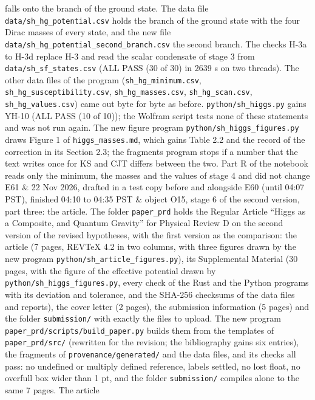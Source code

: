 \documentclass[
  10pt,
]{article}
\begin{document}
\begin{longtable}[]
falls onto the branch of the ground state. The data file
\texttt{data/sh\_hg\_potential.csv} holds the branch of the ground state
with the four Dirac masses of every state, and the new file
\texttt{data/sh\_hg\_potential\_second\_branch.csv} the second branch.
The checks H-3a to H-3d replace H-3 and read the scalar condensate of
stage 3 from \texttt{data/sh\_sf\_states.csv} (ALL PASS (30 of 30) in
2639 s on two threads). The other data files of the program
(\texttt{sh\_hg\_minimum.csv}, \texttt{sh\_hg\_susceptibility.csv},
\texttt{sh\_hg\_masses.csv}, \texttt{sh\_hg\_scan.csv},
\texttt{sh\_hg\_values.csv}) came out byte for byte as before.
\texttt{python/sh\_higgs.py} gains YH-10 (ALL PASS (10 of 10)); the
Wolfram script tests none of these statements and was not run again. The
new figure program \texttt{python/sh\_higgs\_figures.py} draws Figure 1
of \texttt{higgs\_masses.md}, which gains Table 2.2 and the record of
the correction in its Section 2.3; the fragments program stops if a
number that the text writes once for KS and CJT differs between the two.
Part R of the notebook reads only the minimum, the masses and the values
of stage 4 and did not change \\
E61 & 22 Nov 2026, drafted in a test copy before and alongside E60
(until 04:07 PST), finished 04:10 to 04:35 PST & object O15, stage 6 of
the second version, part three: the article. The folder
\texttt{paper\_prd} holds the Regular Article ``Higgs as a Composite,
and Quantum Gravity'' for Physical Review D on the second version of the
revised hypotheses, with the first version as the comparison: the
article (7 pages, REVTeX 4.2 in two columns, with three figures drawn by
the new program \texttt{python/sh\_article\_figures.py}), its
Supplemental Material (30 pages, with the figure of the effective
potential drawn by \texttt{python/sh\_higgs\_figures.py}, every check of
the Rust and the Python programs with its deviation and tolerance, and
the SHA-256 checksums of the data files and reports), the cover letter
(2 pages), the submission information (5 pages) and the folder
\texttt{submission/} with exactly the files to upload. The new program
\texttt{paper\_prd/scripts/build\_paper.py} builds them from the
templates of \texttt{paper\_prd/src/} (rewritten for the revision; the
bibliography gains six entries), the fragments of
\texttt{provenance/generated/} and the data files, and its checks all
pass: no undefined or multiply defined reference, labels settled, no
lost float, no overfull box wider than 1 pt, and the folder
\texttt{submission/} compiles alone to the same 7 pages. The article

\end{longtable}
\end{document}
